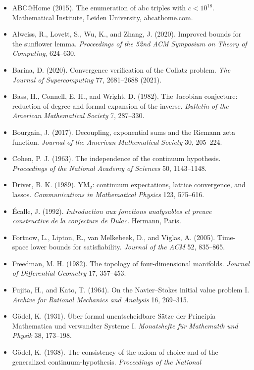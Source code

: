 \documentclass[10pt]{article}
\providecommand{\tightlist}{\setlength{\itemsep}{0pt}\setlength{\parskip}{0pt}}
\begin{document}
\begin{itemize}
\tightlist
\item
  ABC@Home (2015). The enumeration of abc triples with \(c < 10^{18}\).
  Mathematical Institute, Leiden University, abcathome.com.
\item
  Alweiss, R., Lovett, S., Wu, K., and Zhang, J. (2020). Improved bounds
  for the sunflower lemma. \emph{Proceedings of the 52nd ACM Symposium
  on Theory of Computing}, 624--630.
\item
  Barina, D. (2020). Convergence verification of the Collatz problem.
  \emph{The Journal of Supercomputing} 77, 2681--2688 (2021).
\item
  Bass, H., Connell, E. H., and Wright, D. (1982). The Jacobian
  conjecture: reduction of degree and formal expansion of the inverse.
  \emph{Bulletin of the American Mathematical Society} 7, 287--330.
\item
  Bourgain, J. (2017). Decoupling, exponential sums and the Riemann zeta
  function. \emph{Journal of the American Mathematical Society} 30,
  205--224.
\item
  Cohen, P. J. (1963). The independence of the continuum hypothesis.
  \emph{Proceedings of the National Academy of Sciences} 50, 1143--1148.
\item
  Driver, B. K. (1989). YM\(_2\): continuum expectations, lattice
  convergence, and lassos. \emph{Communications in Mathematical Physics}
  123, 575--616.
\item
  Écalle, J. (1992). \emph{Introduction aux fonctions analysables et
  preuve constructive de la conjecture de Dulac.} Hermann, Paris.
\item
  Fortnow, L., Lipton, R., van Melkebeek, D., and Viglas, A. (2005).
  Time-space lower bounds for satisfiability. \emph{Journal of the ACM}
  52, 835--865.
\item
  Freedman, M. H. (1982). The topology of four-dimensional manifolds.
  \emph{Journal of Differential Geometry} 17, 357--453.
\item
  Fujita, H., and Kato, T. (1964). On the Navier--Stokes initial value
  problem I. \emph{Archive for Rational Mechanics and Analysis} 16,
  269--315.
\item
  Gödel, K. (1931). Über formal unentscheidbare Sätze der Principia
  Mathematica und verwandter Systeme I. \emph{Monatshefte für Mathematik
  und Physik} 38, 173--198.
\item
  Gödel, K. (1938). The consistency of the axiom of choice and of the
  generalized continuum-hypothesis. \emph{Proceedings of the National
}
\end{itemize}
\end{document}
